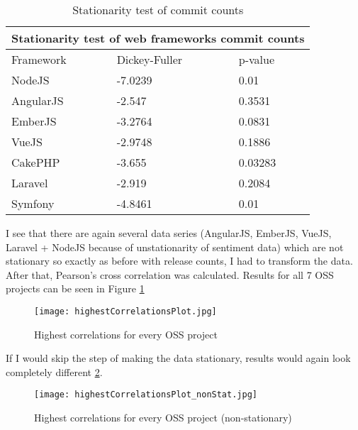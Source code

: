 \begin{table}[H]
\centering
\begin{tabular}{ |p{3cm}||p{3cm}|p{3cm}|  }
 \hline
 \multicolumn{3}{|c|}{Stationarity test of web frameworks commit counts} \\
 \hline
 Framework & Dickey-Fuller & p-value\\
 \hline
 NodeJS   & -7.0239    &0.01\\ \hline
 AngularJS &   -2.547  & 0.3531\\ \hline
 EmberJS & -3.2764 & 0.0831\\ \hline
 VueJS    &-2.9748 & 0.1886\\ \hline
 CakePHP&   -3.655  & 0.03283\\ \hline
 Laravel& -2.919  & 0.2084\\ \hline
 Symfony& -4.8461  & 0.01\\ \hline
\end{tabular}
\caption{Stationarity test of commit counts}
\label{table:stationarity_table_commits}
\end{table}

I see that there are again several data series (AngularJS, EmberJS, VueJS, Laravel + NodeJS because of unstationarity of sentiment data) which are not stationary so exactly as before with release counts, I had to transform the data. After that, Pearson's cross correlation was calculated. Results for all 7 OSS projects can be seen in Figure \ref{fig:highestCorrelationsPlot}

\begin{figure}[H]%
    \centering
	\texttt{[image: highestCorrelationsPlot.jpg]}
    \caption{Highest correlations for every OSS project}%
    \label{fig:highestCorrelationsPlot}%
\end{figure}

If I would skip the step of making the data stationary, results would again look completely different \ref{fig:highestCorrelationsPlot_nonStat}.

\begin{figure}[H]%
    \centering
	\texttt{[image: highestCorrelationsPlot\_nonStat.jpg]}
    \caption{Highest correlations for every OSS project (non-stationary)}%
    \label{fig:highestCorrelationsPlot_nonStat}%
\end{figure}